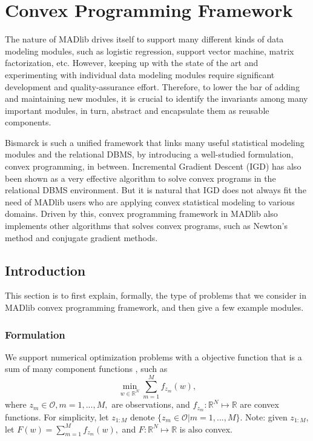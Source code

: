 
\chapter[Convex Programming Framework]{Convex Programming Framework}
The nature of MADlib drives itself to support many different kinds of data modeling modules, such as logistic regression, support vector machine, matrix factorization, etc.
However, keeping up with the state of the art and experimenting with individual data modeling modules require significant development and quality-assurance effort.
Therefore, to lower the bar of adding and maintaining new modules, it is crucial to identify the invariants among many important modules, in turn, abstract and encapsulate them as reusable components.

Bismarck \cite{DBLP:conf/sigmod/FengKRR12} is such a unified framework that links many useful statistical modeling modules and the relational DBMS, by introducing a well-studied formulation, convex programming, in between.
Incremental Gradient Descent (IGD) has also been shown as a very effective algorithm to solve convex programs in the relational DBMS environment.
But it is natural that IGD does not always fit the need of MADlib users who are applying convex statistical modeling to various domains.
Driven by this, convex programming framework in MADlib also implements other algorithms that solves convex programs, such as Newton's method and conjugate gradient methods.

\section{Introduction}
This section is to first explain, formally, the type of problems that we consider in MADlib convex programming framework, and then give a few example modules.

\subsection{Formulation}
We support numerical optimization problems with a objective function that is a sum of many component functions \cite{springerlink:10.1007/s10107-011-0472-0}, such as
\[\min_{w \in \mathbb{R}^N} \sum_{m=1}^M f_{z_m}(w),\]
where $z_m \in \mathcal{O}, m = 1,...,M,$ are observations, and $f_{z_m} : \mathbb{R}^N \mapsto \mathbb{R}$ are convex functions.
For simplicity, let $z_{1:M}$ denote $\{z_m \in \mathcal{O} | m = 1,...,M\}$.
Note: given $z_{1:M}$, let $F(w) = \sum_{m=1}^M f_{z_m}(w),$ and $F : \mathbb{R}^N \mapsto \mathbb{R}$ is also convex.

